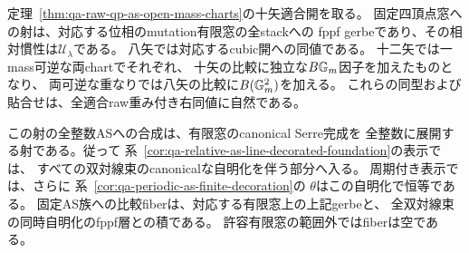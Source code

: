 \begin{theorem}[AS適合QPのcanonical比較と表示慣性]
\label{thm:qa-open-qp-canonical-as-image}
定理~\ref{thm:qa-raw-qp-as-open-mass-charts}の十矢適合開を取る。
固定四頂点窓への射は、対応する位相のmutation有限窓の全stackへの
fppf gerbeであり、その相対慣性は$\mathcal U_\lambda$である。
八矢では対応するcubic開への同値である。
十二矢では一mass可逆な両chartでそれぞれ、
十矢の比較に独立な$B\mathbb G_m$因子を加えたものとなり、
両可逆な重なりでは八矢の比較に$B(\mathbb G_m^2)$を加える。
これらの同型および貼合せは、全適合raw重み付き右同値に自然である。

この射の全整数ASへの合成は、有限窓のcanonical Serre完成を
全整数に展開する射である。従って
系~\ref{cor:qa-relative-as-line-decorated-foundation}の表示では、
すべての双対線束のcanonicalな自明化を伴う部分へ入る。
周期付き表示では、さらに
系~\ref{cor:qa-periodic-as-finite-decoration}の
$\theta$はこの自明化で恒等である。
固定AS族への比較fiberは、対応する有限窓上の上記gerbeと、
全双対線束の同時自明化のfppf層との積である。
許容有限窓の範囲外ではfiberは空である。
\end{theorem}
